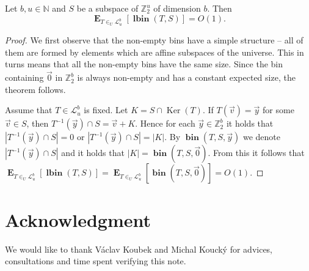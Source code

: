\documentclass[unicode,review]{siamart1116}
\newcommand{\bin}[3]{\operatorname{\mathbf{bin}}({#1}, {#2}, {#3})}
\newcommand{\lbin}[2]{\operatorname{\mathbf{lbin}}({#1}, {#2})}
\newcommand{\vecspace}[2]{\mathbb{Z}_{#1}^{#2}}
\newcommand{\binvecspace}[1]{\vecspace{2}{#1}}
\newcommand{\linearmaps}[2]{\mathcal{L}_{#1}^{#2}}
\newcommand{\expects}[2]{\operatorname{\mathbf{E}}_{{#1}}\left[{#2}\right]}
\numberwithin{theorem}{section}
\begin{document}
\begin{theorem}
Let $b, u \in \mathbb{N}$ and $S$ be a subspace of $\binvecspace{u}$ of dimension $b$. Then \[ \expects{T \in_U \linearmaps{u}{b}}{\lbin{T}{S}} = O(1).\]
\end{theorem}
\begin{proof}
We first observe that the non-empty bins have a simple structure -- all of them are formed by elements which are affine subspaces of the universe.
This in turns means that all the non-empty bins have the same size.
Since the bin containing $\vec{0}$ in $\binvecspace{b}$ is always non-empty and has a constant expected size, the theorem follows.

Assume that $T \in \linearmaps{u}{b}$ is fixed.
Let $K = S \cap \operatorname{Ker}(T)$.
If $T(\vec{v}) = \vec{y}$ for some $\vec{v} \in S$, then $T^{-1}(\vec y) \cap S = \vec v + K$.
Hence for each $\vec y \in \mathbb{Z}_2^b$ it holds that $|T^{-1}(\vec y) \cap S| = 0$ or $|T^{-1}(\vec y) \cap S| = |K|$.
By $\bin{T}{S}{\vec{y}}$ we denote $|T^{-1}(\vec{y}) \cap S|$ and it holds that $|K| = \bin{T}{S}{\vec 0}$.
From this it follows that 
$
\expects{T\in_U \linearmaps{u}{b}}{\lbin{T}{S}} = \expects{T\in_U \linearmaps{u}{b}}{\bin{T}{S}{\vec 0}} = O(1).
$

\end{proof}

\section{Acknowledgment}

We would like to thank V\'aclav Koubek and Michal Kouck\'y for advices, consultations and time spent verifying this note.



\end{document}
